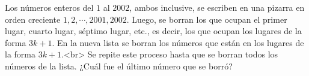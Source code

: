 Los números enteros del $1$ al $2002$, ambos inclusive, se escriben en una pizarra en orden creciente $1, 2, \cdots , 2001, 2002$. Luego, se borran los que ocupan el primer lugar, cuarto lugar, séptimo lugar, etc., es decir, los que ocupan los lugares de la forma $3k + 1$. En la nueva lista se borran los números que están en los lugares de la forma $3k + 1$.<br>
Se repite este proceso hasta que se borran todos los números de la lista. ¿Cuál fue el último número que se borró?
